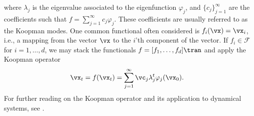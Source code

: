 \documentclass{article}
\begin{document}
where \(\lambda_j\) is the eigenvalue associated to the eigenfunction \(\varphi_j\), and \(\{c_j\}_{j=1}^{\infty}\) are the coefficients such that \(f = \sum_{j=1}^{\infty} c_j \varphi_j\). These coefficients are usually referred to as the Koopman modes. One common functional often considered is \(f_i(\vx) = \vx_i\), i.e., a mapping from the vector \(\vx\) to the \(i\)'th component of the vector. If \(f_i \in \mathcal{F}\) for \(i=1,\dots, d\), we may stack the functionals \(f= [f_1, \dots, f_d]\tran\) and apply the Koopman operator
\begin{align*}
   \vx_t =  f(\vx_t) = \sum_{j=1}^{\infty} \vc_j \lambda_j^t \varphi_j(\vx_0).
\end{align*}
For further reading on the Koopman operator and its application to dynamical systems, see \citet{budisic-2012}.
\end{document}
